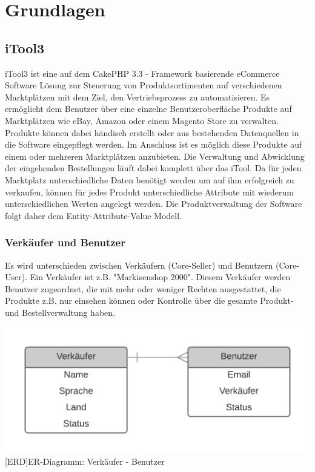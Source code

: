 \section{Grundlagen}
	
	\subsection{iTool3}
	
	iTool3 ist eine auf dem CakePHP 3.3 - Framework basierende eCommerce Software Lösung zur Steuerung von Produktsortimenten auf verschiedenen Marktplätzen mit dem Ziel, den
	Vertriebsprozess zu automatisieren. Es ermöglicht dem Benutzer über eine einzelne Benutzeroberfläche Produkte auf Marktplätzen wie eBay, Amazon oder einem Magento Store
	zu verwalten. Produkte können dabei händisch erstellt oder aus bestehenden Datenquellen in die Software	eingepflegt werden. Im Anschluss ist es möglich diese Produkte auf einem oder mehreren Marktplätzen anzubieten. Die Verwaltung und Abwicklung der eingehenden Bestellungen läuft dabei komplett über das iTool.
	Da für jeden Marktplatz unterschiedliche Daten benötigt werden um auf ihm erfolgreich zu verkaufen, können für jedes Produkt unterschiedliche Attribute mit wiederum unterschiedlichen Werten angelegt werden. Die Produktverwaltung der Software folgt daher dem Entity-Attribute-Value Modell.
	
	
	\subsubsection{Verkäufer und Benutzer}
	
	Es wird unterschieden zwischen Verkäufern (Core-Seller) und Benutzern (Core-User). Ein Verkäufer ist z.B. "Markisenshop 2000". Diesem Verkäufer werden Benutzer zugeordnet, die mit mehr oder weniger Rechten ausgestattet, die Produkte z.B. nur einsehen können oder Kontrolle über die gesamte Produkt- und Bestellverwaltung haben.\\
	\begin{minipage}{\linewidth}
		\vspace{1em}
		\centering
		\includegraphics[width=0.6\linewidth]{img/ERD_Seller_User_complete}
		[ERD]{ER-Diagramm: Verkäufer - Benutzer}
		\label{fig:header}
		\vspace{1em}
	\end{minipage}
	
